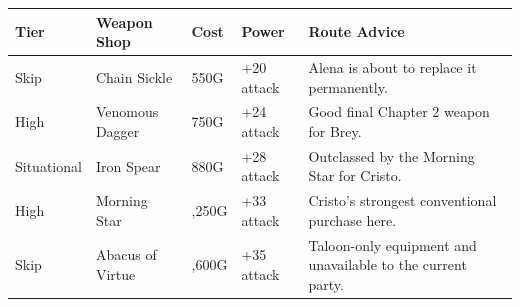 \documentclass[
  american,
  10pt,
  letterpaper,
  oneside,
  open=any]{scrreprt}
\newcounter{none} %
\newenvironment{guidetable}{%
  \small\setstretch{1.0}%
  \setlength{\tabcolsep}{4pt}%
  \setlength{\LTpre}{8pt}\setlength{\LTpost}{10pt}%
  \renewcommand{\arraystretch}{1.16}%
}{ }
\begin{document}
\begin{guidetable}

{\def\LTcaptype{none} %
\begin{longtable}[]{@{}
  >{\raggedright\arraybackslash}p{}
  >{\raggedright\arraybackslash}p{}
  >{\raggedleft\arraybackslash}p{}
  >{\raggedleft\arraybackslash}p{}
  >{\raggedright\arraybackslash}p{}@{}}
\toprule\noalign{}
\begin{minipage}[b]{\linewidth}\raggedright
\color{GuideGreen}\bfseries Tier
\end{minipage} & \begin{minipage}[b]{\linewidth}\raggedright
\color{GuideGreen}\bfseries Weapon Shop
\end{minipage} & \begin{minipage}[b]{\linewidth}\raggedleft
\color{GuideGreen}\bfseries Cost
\end{minipage} & \begin{minipage}[b]{\linewidth}\raggedleft
\color{GuideGreen}\bfseries Power
\end{minipage} & \begin{minipage}[b]{\linewidth}\raggedright
\color{GuideGreen}\bfseries Route Advice
\end{minipage} \\
\midrule\noalign{}
\endhead
\bottomrule\noalign{}
\endlastfoot
Skip & Chain Sickle & 550G & +20 attack & Alena is about to replace it
permanently. \\
High & Venomous Dagger & 750G & +24 attack & Good final Chapter 2 weapon
for Brey. \\
Situational & Iron Spear & 880G & +28 attack & Outclassed by the Morning
Star for Cristo. \\
High & Morning Star & 1,250G & +33 attack & Cristo's strongest
conventional purchase here. \\
Skip & Abacus of Virtue & 1,600G & +35 attack & Taloon-only equipment
and unavailable to the current party. \\
\end{longtable}
}

\end{guidetable}
\end{document}
